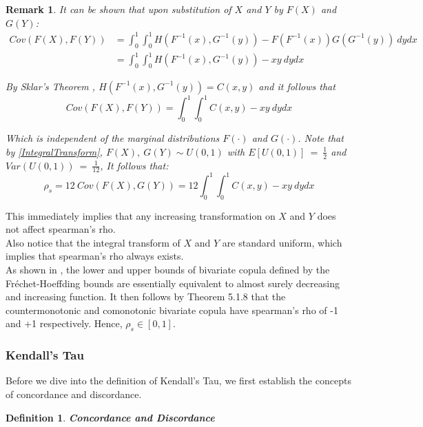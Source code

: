 \documentclass[12pt]{report}
\newtheorem{remark}{Remark}[section]
\newtheorem{definition}{Definition}[subsection]
\newcommand{\1}{\mathbf{1}}
\begin{document}
\begin{flushleft}
\begin{remark}
It can be shown that upon substitution of $X$ and $Y$ by $F(X)$ and $G(Y)$: 
\begin{align*}
Cov(F(X),F(Y)) &= \int_{0}^{1} \int_{0}^{1} H(F^{-1}(x),G^{-1}(y)) - F(F^{-1}(x))G(G^{-1}(y)) \: dydx \\
&= \int_{0}^{1} \int_{0}^{1} H(F^{-1}(x),G^{-1}(y)) - xy \: dydx
\end{align*}

By Sklar's Theorem \parencite{SklarTheorem}, $H(F^{-1}(x),G^{-1}(y)) = C(x,y)$ and it follows that 
\begin{equation*}
Cov(F(X),F(Y)) = \int_{0}^{1} \int_{0}^{1} C(x,y) - xy \: dydx
\end{equation*}

Which is independent of the marginal distributions $F(\cdot)$ and $G(\cdot)$. Note that by \ref{IntegralTransform}, $F(X), \: G(Y) \sim U(0,1)$ with $E[U(0,1)] \: = \: \frac{1}{2}$ and $Var(U(0,1)) \: = \: \frac{1}{12}$, It follows that:
\begin{equation*}
\rho_{s} = 12 \: Cov(F(X),G(Y)) = 12 \int_{0}^{1} \int_{0}^{1} C(x,y) - xy \: dydx
\end{equation*}
\end{remark} 
This immediately implies that any increasing transformation on $X$ and $Y$ does not affect spearman's rho.\\
\vspace{0.5cm}
Also notice that the integral transform of $X$ and $Y$ are standard uniform, which implies that spearman's rho always exists.\\
\vspace{0.5cm}
As shown in \cite{HofertBook}, the lower and upper bounds of bivariate copula defined by the Fr{\'e}chet-Hoeffding bounds are essentially equivalent to almost surely decreasing and increasing function. It then follows by \cite{NelsenCopulabook2006} Theorem 5.1.8 that the countermonotonic and comonotonic bivariate copula have spearman's rho of -1 and +1 respectively. Hence, $\rho_{s} \in [0,1]$.

\subsubsection{Kendall's Tau}
\vspace{0.5cm}
Before we dive into the definition of Kendall's Tau, we first establish the concepts of concordance and discordance.

\begin{definition}\label{concorddiscorddef}\textbf{Concordance and Discordance} \\


\end{definition}
\end{flushleft}
\end{document}
